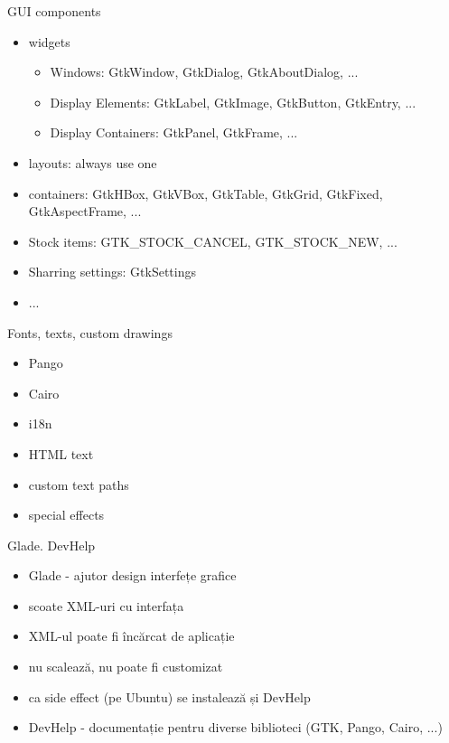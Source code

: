 \documentclass{beamer}
\begin{document}
\begin{frame}{GUI components}
  \begin{itemize}[<+->]
    \item widgets
      \begin{itemize}
        \item Windows: GtkWindow, GtkDialog, GtkAboutDialog, ...
        \item Display Elements: GtkLabel, GtkImage, GtkButton, GtkEntry, ...
        \item Display Containers: GtkPanel, GtkFrame, ...
      \end{itemize}
    \item layouts: always use one
    \item containers: GtkHBox, GtkVBox, GtkTable, GtkGrid, GtkFixed,
      GtkAspectFrame, ...
    \item Stock items: GTK\_STOCK\_CANCEL, GTK\_STOCK\_NEW, ...
    \item Sharring settings: GtkSettings
    \item ...
  \end{itemize}
\end{frame}

\begin{frame}{Fonts, texts, custom drawings}
  \begin{itemize}
    \item Pango
    \item Cairo
  \end{itemize}
  \pause
  \begin{itemize}
    \item i18n
    \item HTML text
    \item custom text paths
    \item special effects
  \end{itemize}
\end{frame}

\begin{frame}{Glade. DevHelp}
  \begin{itemize}
    \item Glade - ajutor design interfețe grafice
    \item scoate XML-uri cu interfața
    \item XML-ul poate fi încărcat de aplicație
    \item nu scalează, nu poate fi customizat
  \pause
    \item ca side effect (pe Ubuntu) se instalează și DevHelp
    \item DevHelp - documentație pentru diverse biblioteci (GTK, Pango, Cairo, ...)
  \end{itemize}
\end{frame}
\end{document}
